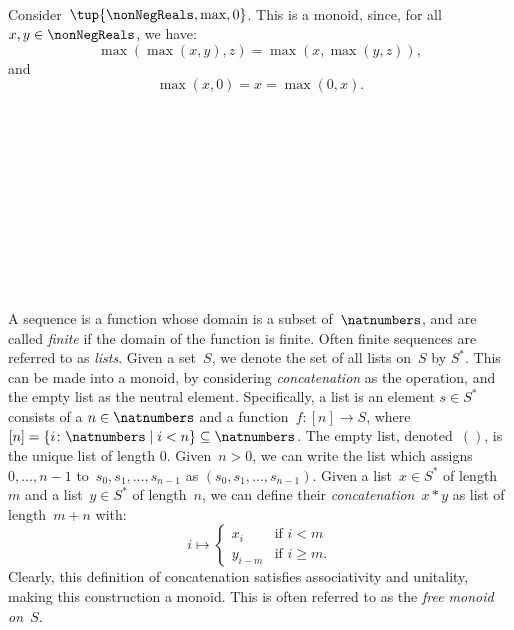 \

\

\



\

\

\



\begin{example}
  Consider~$\tup{\nonNegReals,\max,0}$. This is a monoid, since, for all~$x,y\in \nonNegReals$, we have:
  \begin{equation*}
    \max(\max(x,y),z)=\max(x,\max(y,z)),
  \end{equation*}
  and
  \begin{equation*}
    \max(x,0)=x=\max(0,x).
  \end{equation*}
\end{example}



\

\

\



\

\

\


\begin{example}[Sequences]
  A sequence is a function whose domain is a subset of~$\natnumbers$, and are called \emph{finite} if the domain of the function is finite. Often finite sequences are referred to as \emph{lists}. Given a set~$S$, we denote the set of all lists on~$S$ by $S^\ast$. This can be made into a monoid, by considering \emph{concatenation} as the operation, and the empty list as the neutral element. Specifically, a list is an element $s\in S^\ast$ consists of a $n\in \natnumbers$ and a function~$f\colon [n]\to S$, where~$[n]=\{i\colon \natnumbers\mid i<n\}\subseteq \natnumbers$. The empty list, denoted~$()$, is the unique list of length 0. Given~$n>0$, we can write the list which assigns~$0,\ldots,n-1$ to~$s_0,s_1,\ldots,s_{n-1}$ as $(s_0,s_1,\ldots,s_{n-1})$. Given a list~$x\in S^\ast$ of length~$m$ and a list~$y\in S^\ast$ of length~$n$, we can define their \emph{concatenation}~$x*y$ as list of length~$m+n$ with:
  \begin{equation*}
    i\mapsto
    \begin{cases}
      x_i&\text{if }i<m\\
      y_{i-m}&\text{if }i\geq m.
    \end{cases}
  \end{equation*}
  Clearly, this definition of concatenation satisfies associativity and unitality, making this construction a monoid. This is often referred to as the \emph{free monoid on~$S$}.
\end{example}


